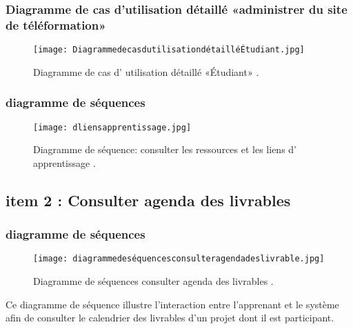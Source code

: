 \subsubsection{Diagramme de cas d’utilisation  détaillé «administrer du site de téléformation» }

\begin{figure}[ht]
	\centering
	\texttt{[image: DiagrammedecasdutilisationdétailléÉtudiant.jpg]}
	\caption{Diagramme de cas d' utilisation  détaillé «Étudiant» .}
	\label{fig:Diagramme de cas d' utilisation  détaillé Étudiant  }
\end{figure}
\FloatBarrier






\subsubsection{diagramme de séquences }


\begin{figure}[ht]
	\centering
	\texttt{[image: dliensapprentissage.jpg]}
	\caption{Diagramme de séquence: consulter les ressources et les liens d' apprentissage .}
	\label{fig:diagramme de séquence: consulter les ressources et les liens d' apprentissage }
\end{figure}
\FloatBarrier




\clearpage
\subsection{item 2 : Consulter agenda des livrables}
\subsubsection{diagramme de séquences }


\begin{figure}[ht]
	\centering
	\texttt{[image: diagrammedeséquencesconsulteragendadeslivrable.jpg]}
	\caption{Diagramme de séquences consulter agenda des livrables .}
	\label{fig:Diagramme de séquences consulter agenda des livrables }
\end{figure}
\FloatBarrier

Ce diagramme de séquence illustre l’interaction entre l’apprenant et le système afin de consulter le
calendrier des livrables d’un projet dont il est participant.
\clearpage
